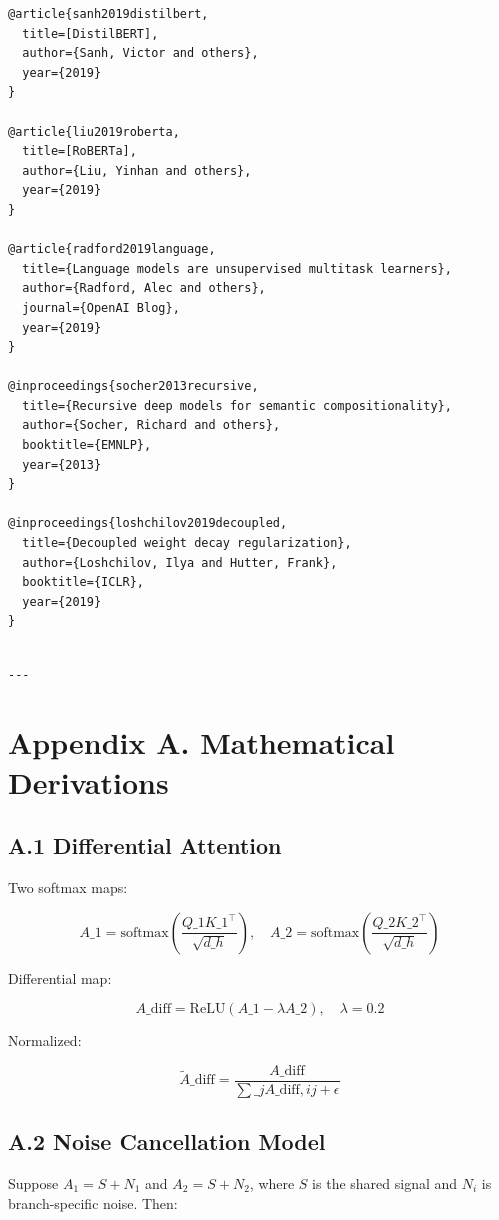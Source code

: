 \begin{lstlisting}
@article{sanh2019distilbert,
  title=[DistilBERT],
  author={Sanh, Victor and others},
  year={2019}
}

@article{liu2019roberta,
  title=[RoBERTa],
  author={Liu, Yinhan and others},
  year={2019}
}

@article{radford2019language,
  title={Language models are unsupervised multitask learners},
  author={Radford, Alec and others},
  journal={OpenAI Blog},
  year={2019}
}

@inproceedings{socher2013recursive,
  title={Recursive deep models for semantic compositionality},
  author={Socher, Richard and others},
  booktitle={EMNLP},
  year={2013}
}

@inproceedings{loshchilov2019decoupled,
  title={Decoupled weight decay regularization},
  author={Loshchilov, Ilya and Hutter, Frank},
  booktitle={ICLR},
  year={2019}
}
\end{lstlisting}
\begin{lstlisting}

---
\end{lstlisting}

\section{Appendix A. Mathematical Derivations}

\subsection{A.1 Differential Attention}

Two softmax maps:

\[
A\_1 = \text{softmax}\!\left(\frac{Q\_1 K\_1^\top}{\sqrt{d\_h}}\right), \quad
A\_2 = \text{softmax}\!\left(\frac{Q\_2 K\_2^\top}{\sqrt{d\_h}}\right)
\tag{A.1}
\]

Differential map:

\[
A\_\text{diff} = \text{ReLU}(A\_1 - \lambda A\_2), \quad \lambda = 0.2
\tag{A.2}
\]

Normalized:

\[
\tilde{A}\_\text{diff} = \frac{A\_\text{diff}}{\sum\_j A\_{\text{diff}, ij} + \epsilon}
\tag{A.3}
\]

\subsection{A.2 Noise Cancellation Model}

Suppose $A_1 = S + N_1$ and $A_2 = S + N_2$, where $S$ is the shared 
signal and $N_i$ is branch-specific noise. Then:

